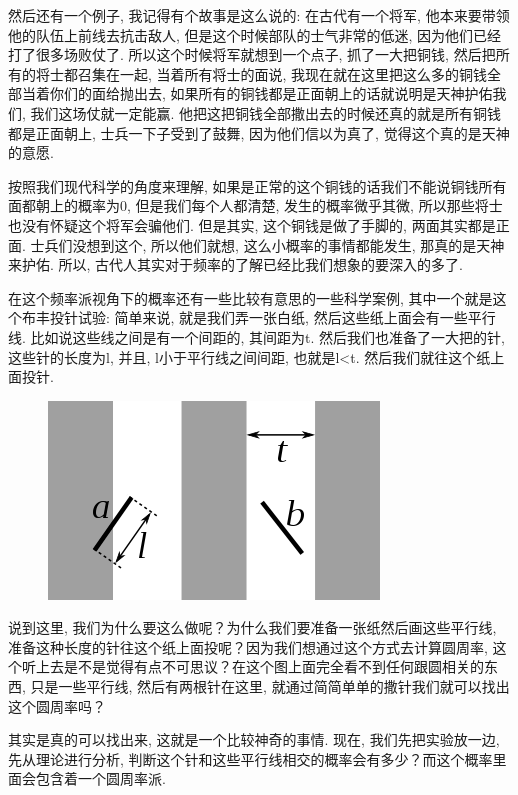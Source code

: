然后还有一个例子, 我记得有个故事是这么说的: 在古代有一个将军, 他本来要带领他的队伍上前线去抗击敌人, 但是这个时候部队的士气非常的低迷, 因为他们已经打了很多场败仗了. 所以这个时候将军就想到一个点子, 抓了一大把铜钱, 然后把所有的将士都召集在一起, 当着所有将士的面说, 我现在就在这里把这么多的铜钱全部当着你们的面给抛出去, 如果所有的铜钱都是正面朝上的话就说明是天神护佑我们, 我们这场仗就一定能赢. 他把这把铜钱全部撒出去的时候还真的就是所有铜钱都是正面朝上, 士兵一下子受到了鼓舞, 因为他们信以为真了, 觉得这个真的是天神的意愿. 

按照我们现代科学的角度来理解, 如果是正常的这个铜钱的话我们不能说铜钱所有面都朝上的概率为0, 但是我们每个人都清楚, 发生的概率微乎其微, 所以那些将士也没有怀疑这个将军会骗他们. 但是其实, 这个铜钱是做了手脚的, 两面其实都是正面. 士兵们没想到这个, 所以他们就想, 这么小概率的事情都能发生, 那真的是天神来护佑. 所以, 古代人其实对于频率的了解已经比我们想象的要深入的多了. 

在这个频率派视角下的概率还有一些比较有意思的一些科学案例, 其中一个就是这个布丰投针试验: 简单来说, 就是我们弄一张白纸, 然后这些纸上面会有一些平行线. 比如说这些线之间是有一个间距的, 其间距为t. 然后我们也准备了一大把的针, 这些针的长度为l, 并且, l小于平行线之间间距, 也就是l<t. 然后我们就往这个纸上面投针. 

\begin{figure}[ht]
  \centering
  \includegraphics[width=0.6\linewidth]{asset/20230916012927.png}
  \caption{}
  \label{fig:img20_3}
\end{figure}

说到这里, 我们为什么要这么做呢？为什么我们要准备一张纸然后画这些平行线, 准备这种长度的针往这个纸上面投呢？因为我们想通过这个方式去计算圆周率, 这个听上去是不是觉得有点不可思议？在这个图上面完全看不到任何跟圆相关的东西, 只是一些平行线, 然后有两根针在这里, 就通过简简单单的撒针我们就可以找出这个圆周率吗？

其实是真的可以找出来, 这就是一个比较神奇的事情. 现在, 我们先把实验放一边, 先从理论进行分析, 判断这个针和这些平行线相交的概率会有多少？而这个概率里面会包含着一个圆周率派. 

